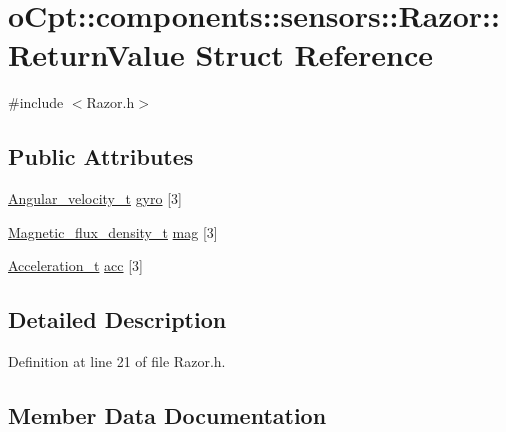 \hypertarget{structo_cpt_1_1components_1_1sensors_1_1_razor_1_1_return_value}{}\section{o\+Cpt\+:\+:components\+:\+:sensors\+:\+:Razor\+:\+:Return\+Value Struct Reference}
\label{structo_cpt_1_1components_1_1sensors_1_1_razor_1_1_return_value}


{\ttfamily \#include $<$Razor.\+h$>$}

\subsection*{Public Attributes}
\begin{DoxyCompactItemize}
\item 
\hyperlink{classo_cpt_1_1components_1_1sensors_1_1_razor_a2667055c5eda244f9dd5235159d86184}{Angular\+\_\+velocity\+\_\+t} \hyperlink{structo_cpt_1_1components_1_1sensors_1_1_razor_1_1_return_value_a4f6fb4d2ff69d6d41c988ef296398768}{gyro} \mbox{[}3\mbox{]}
\item 
\hyperlink{classo_cpt_1_1components_1_1sensors_1_1_razor_ae8fa7bff60dd03d8603e7c7d757ae061}{Magnetic\+\_\+flux\+\_\+density\+\_\+t} \hyperlink{structo_cpt_1_1components_1_1sensors_1_1_razor_1_1_return_value_a6f99ff2804c95957a727a47e56f57a2d}{mag} \mbox{[}3\mbox{]}
\item 
\hyperlink{classo_cpt_1_1components_1_1sensors_1_1_razor_a4ebbe9ca2661c07f9665a32a7dd38e0c}{Acceleration\+\_\+t} \hyperlink{structo_cpt_1_1components_1_1sensors_1_1_razor_1_1_return_value_af1f2de393c1883e5fcc9e1655ec57c72}{acc} \mbox{[}3\mbox{]}
\end{DoxyCompactItemize}


\subsection{Detailed Description}


Definition at line 21 of file Razor.\+h.



\subsection{Member Data Documentation}
\hypertarget{structo_cpt_1_1components_1_1sensors_1_1_razor_1_1_return_value_af1f2de393c1883e5fcc9e1655ec57c72}{}\label{structo_cpt_1_1components_1_1sensors_1_1_razor_1_1_return_value_af1f2de393c1883e5fcc9e1655ec57c72} 
